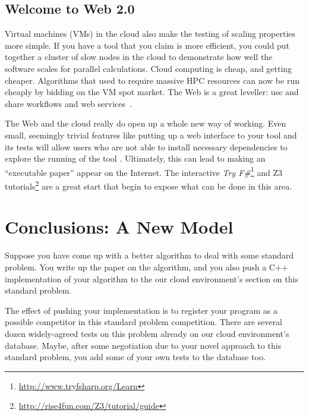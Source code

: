 \documentclass[a4paper,11pt]{article}
\begin{document}
\subsection{Welcome to Web 2.0}

Virtual machines (VMs) in the cloud also make the testing of scaling
properties more simple.  If you have a tool that you claim is more
efficient, you could put together a cluster of slow nodes in the cloud
to demonstrate how well the software scales for parallel calculations.
Cloud computing is cheap, and getting cheaper. Algorithms that used to
require massive HPC resources can now be run cheaply by bidding on the
VM spot market. The Web is a great leveller: use and share workflows
and web services~\cite{crick-et-al:2009b}.

 The Web and the
cloud really do open up a whole new way of working. Even small,
seemingly trivial features like putting up a web interface to your
tool and its tests will allow users who are not able to install
necessary dependencies to explore the running of the tool
\cite{Hall2014}. Ultimately, this can lead to making an ``executable
paper'' appear on the Internet. The interactive {\em Try
F\#}\footnote{\url{http://www.tryfsharp.org/Learn}} and Z3
tutorials\footnote{\url{http://rise4fun.com/Z3/tutorial/guide}} are a
great start that begin to expose what can be done in this area.


\section{Conclusions: A New Model}\label{sec:Conclusion} 

\newline\newline Suppose you have come up with a better
algorithm to deal with some standard problem.  You write up the paper
on the algorithm, and you also push a C++ implementation of your
algorithm to the our cloud environment's section on this standard problem.

The effect of pushing your implementation is to register your program
as a possible competitor in this standard problem competition. There
are several dozen widely-agreed tests on this problem already on our
cloud environment's database. Maybe, after some negotiation due to
your novel approach to this standard problem, you add some of your own
tests to the database too.
\end{document}
